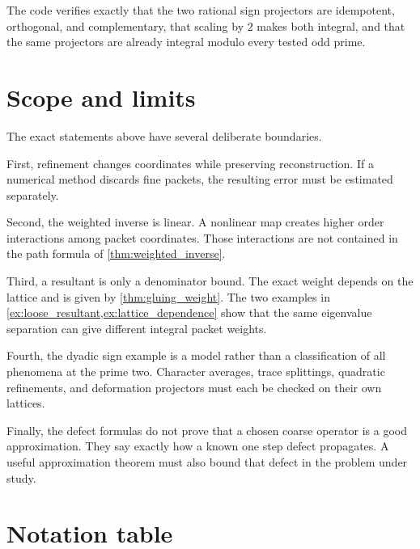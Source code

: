 \begin{certificate}
The code verifies exactly that the two rational sign projectors are idempotent, orthogonal, and complementary, that scaling by $2$ makes both integral, and that the same projectors are already integral modulo every tested odd prime.
\end{certificate}


\section{Scope and limits}\label{sec:limits}

The exact statements above have several deliberate boundaries.

First, refinement changes coordinates while preserving reconstruction. If a numerical method discards fine packets, the resulting error must be estimated separately.

Second, the weighted inverse is linear.  A nonlinear map creates higher order interactions among packet coordinates.  Those interactions are not contained in the path formula of \cref{thm:weighted_inverse}.

Third, a resultant is only a denominator bound.  The exact weight depends on the lattice and is given by \cref{thm:gluing_weight}.  The two examples in \cref{ex:loose_resultant,ex:lattice_dependence} show that the same eigenvalue separation can give different integral packet weights.

Fourth, the dyadic sign example is a model rather than a classification of all phenomena at the prime two.  Character averages, trace splittings, quadratic refinements, and deformation projectors must each be checked on their own lattices.

Finally, the defect formulas do not prove that a chosen coarse operator is a good approximation.  They say exactly how a known one step defect propagates.  A useful approximation theorem must also bound that defect in the problem under study.



\appendix
\section{Notation table}


